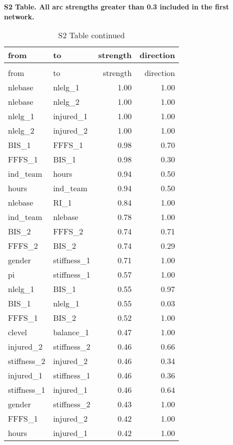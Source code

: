 \documentclass[
]{article}
\begin{document}
\newpage

\textbf{S2 Table. All arc strengths greater than 0.3 included in the first network.}

\begin{longtable}[t]{l|l|r|r}
\caption{\label{tab:unnamed-chunk-3}}\\
\hline
from & to & strength & direction\\
\hline
\endfirsthead
\caption[]{ S2 Table continued}\\
\hline
from & to & strength & direction\\
\hline
\endhead
nlebase & nlelg\_1 & 1.00 & 1.00\\
\hline
nlebase & nlelg\_2 & 1.00 & 1.00\\
\hline
nlelg\_1 & injured\_1 & 1.00 & 1.00\\
\hline
nlelg\_2 & injured\_2 & 1.00 & 1.00\\
\hline
BIS\_1 & FFFS\_1 & 0.98 & 0.70\\
\hline
FFFS\_1 & BIS\_1 & 0.98 & 0.30\\
\hline
ind\_team & hours & 0.94 & 0.50\\
\hline
hours & ind\_team & 0.94 & 0.50\\
\hline
nlebase & RI\_1 & 0.84 & 1.00\\
\hline
ind\_team & nlebase & 0.78 & 1.00\\
\hline
BIS\_2 & FFFS\_2 & 0.74 & 0.71\\
\hline
FFFS\_2 & BIS\_2 & 0.74 & 0.29\\
\hline
gender & stiffness\_1 & 0.71 & 1.00\\
\hline
pi & stiffness\_1 & 0.57 & 1.00\\
\hline
nlelg\_1 & BIS\_1 & 0.55 & 0.97\\
\hline
BIS\_1 & nlelg\_1 & 0.55 & 0.03\\
\hline
FFFS\_1 & BIS\_2 & 0.52 & 1.00\\
\hline
clevel & balance\_1 & 0.47 & 1.00\\
\hline
injured\_2 & stiffness\_2 & 0.46 & 0.66\\
\hline
stiffness\_2 & injured\_2 & 0.46 & 0.34\\
\hline
injured\_1 & stiffness\_1 & 0.46 & 0.36\\
\hline
stiffness\_1 & injured\_1 & 0.46 & 0.64\\
\hline
gender & stiffness\_2 & 0.43 & 1.00\\
\hline
FFFS\_1 & injured\_2 & 0.42 & 1.00\\
\hline
hours & injured\_1 & 0.42 & 1.00\\

\end{longtable}
\end{document}
